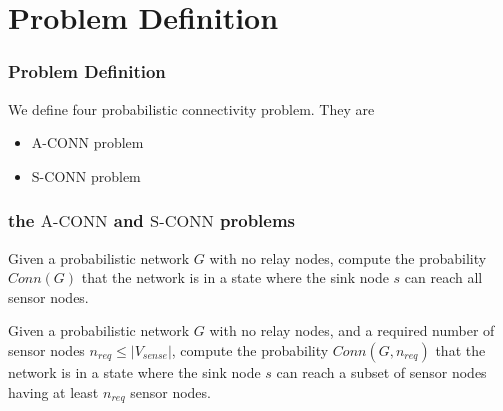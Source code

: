 \documentclass{beamer}
\newcommand{\ACONN}   { {\mathrm {A\mbox{-}CONN}} }
\newcommand{\SCONN}   { {\mathrm {S\mbox{-}CONN}} }
\begin{document}
\section{Problem Definition}
\begin{frame}
\frametitle{Problem Definition}
We define four probabilistic connectivity problem. They are 
\begin{itemize}
\item $\ACONN$ problem
\item $\SCONN$ problem

\end{itemize}
\end{frame}
\begin{frame}
\frametitle{the $\ACONN$  and $\SCONN$ problems}
\begin{definition}
\normalfont
Given a probabilistic network $G$ with no relay nodes, compute the probability $Conn(G)$ that the network is in a state where the sink node $s$ can reach all sensor nodes. 
\end{definition}

\begin{definition}
Given a probabilistic network $G$ with no relay nodes, and a required number of sensor nodes $n_{req}\leq |V_{sense}|$, compute the probability $Conn(G,n_{req})$ that the network is in a state where the sink node $s$ can reach a subset of sensor nodes having at least $n_{req}$ sensor nodes. 
\end{definition}


\end{frame}


\end{document}
